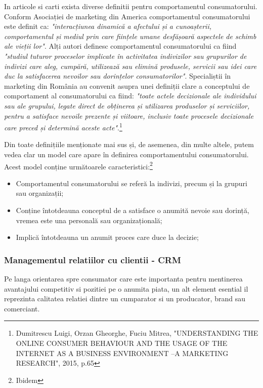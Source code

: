 \documentclass[a4paper, 12pt]{article}
\begin{document}
		\quad In articole si carti exista diverse definitii pentru comportamentul consumatorului. 
		Conform Asociației de marketing din America comportamentul consumatorului este definit ca: \textit{"interacțiunea dinamică a afectului și a cunoașterii, comportamentul și mediul prin care ființele umane desfășoară aspectele de schimb ale vieții lor"}. Alți autori definesc comportamentul consumatorului ca fiind \textit{"studiul tuturor proceselor implicate în activitatea indivizilor sau grupurilor de indivizi care aleg, cumpără, utilizează sau elimină produsele, servicii sau idei care duc la satisfacerea nevoilor sau dorințelor consumatorilor"}. Specialiștii în marketing din România au convenit asupra unei definiții clare a conceptului de comportament al consumatorului ca fiind: \textit{"toate actele decizionale ale individului sau ale grupului, legate direct de obținerea și utilizarea produselor și serviciilor, pentru a satisface nevoile prezente și viitoare, inclusiv toate procesele decizionale care preced și determină aceste acte"}.\footnote{Dumitrescu Luigi, Orzan Gheorghe, Fuciu Mitrea, "UNDERSTANDING THE ONLINE CONSUMER BEHAVIOUR AND THE USAGE OF THE INTERNET AS A BUSINESS ENVIRONMENT –A MARKETING RESEARCH", 2015, p.65} 
		
		\quad Din toate definițiile menționate mai sus și, de asemenea, din multe altele, putem vedea clar un model care apare în definirea comportamentului consumatorului. Acest model conține următoarele caracteristici:\footnote{Ibidem}

		\begin{itemize}
			\item Comportamentul consumatorului se referă la indivizi, precum și la grupuri sau
			organizații;
			\item Conține întotdeauna conceptul de a satisface o anumită nevoie sau dorință,
			vremea este una personală sau organizațională;
			\item Implică întotdeauna un anumit proces care duce la decizie;
		\end{itemize}
	
			\subsubsection{Managementul relatiilor cu clientii - CRM}
		\quad Pe langa orientarea spre consumator care este importanta pentru mentinerea avantajului competitiv si pozitiei pe o anumita piata, un alt element esential il reprezinta calitatea relatiei dintre un cumparator si un producator, brand sau comerciant.
		
\end{document}
